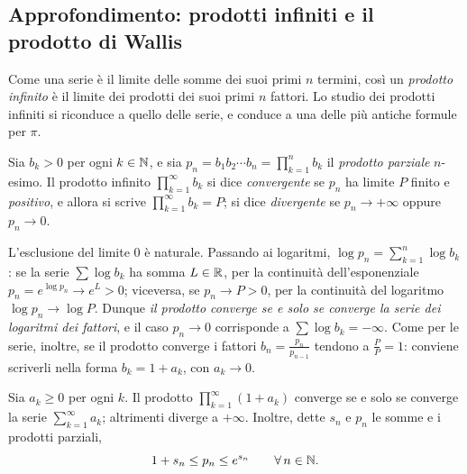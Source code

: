 \subsection{Approfondimento: prodotti infiniti e il prodotto di Wallis}
\label{subsec:prodotti-infiniti}

Come una serie è il limite delle somme dei suoi primi $n$ termini, così un \emph{prodotto
infinito} è il limite dei prodotti dei suoi primi $n$ fattori. Lo studio dei prodotti
infiniti si riconduce a quello delle serie, e conduce a una delle più antiche formule
per $\pi$.

\begin{definizione}\label{def:prodotto-infinito}
Sia $b_{k}>0$ per ogni $k\in\mathbb{N}$, e sia $p_{n}=b_{1}b_{2}\cdots b_{n}=\prod_{k=1}^{n}b_{k}$ il \emph{prodotto
parziale} $n$-esimo. Il prodotto infinito $\prod_{k=1}^{\infty}b_{k}$ si dice \emph{convergente} se
$p_{n}$ ha limite $P$ finito e \emph{positivo}, e allora si scrive $\prod_{k=1}^{\infty}b_{k}=P$; si
dice \emph{divergente} se $p_{n}\to+\infty$ oppure $p_{n}\to0$.
\end{definizione}

L'esclusione del limite $0$ è naturale. Passando ai logaritmi,
$\log p_{n}=\sum_{k=1}^{n}\log b_{k}$: se la serie $\sum\log b_{k}$ ha somma $L\in\mathbb{R}$, per la continuità
dell'esponenziale $p_{n}=e^{\log p_{n}}\to e^{L}>0$; viceversa, se $p_{n}\to P>0$, per la continuità del
logaritmo $\log p_{n}\to\log P$. Dunque \emph{il prodotto converge se e solo se converge la
serie dei logaritmi dei fattori}, e il caso $p_{n}\to0$ corrisponde a $\sum\log b_{k}=-\infty$. Come
per le serie, inoltre, se il prodotto converge i fattori $b_{n}=\frac{p_{n}}{p_{n-1}}$ tendono a
$\frac PP=1$: conviene scriverli nella forma $b_{k}=1+a_{k}$, con $a_{k}\to0$.

\begin{teorema}\label{teo:prodotti-infiniti}
Sia $a_{k}\ge0$ per ogni $k$. Il prodotto $\prod_{k=1}^{\infty}(1+a_{k})$ converge se e solo se
converge la serie $\sum_{k=1}^{\infty}a_{k}$; altrimenti diverge a $+\infty$. Inoltre, dette $s_{n}$ e
$p_{n}$ le somme e i prodotti parziali,
\begin{equation}\label{eq:prodotti-stime}
  1+s_{n}\le p_{n}\le e^{s_{n}} \qquad\forall\, n\in\mathbb{N} .
\end{equation}
\end{teorema}

\begin{schema}
\end{schema}

